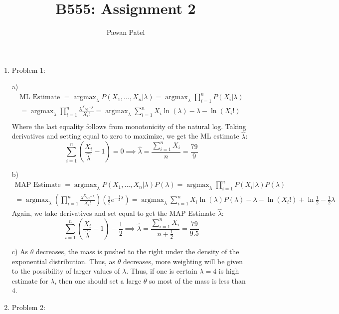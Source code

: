 \documentclass[12pt]{article}
\theoremstyle{plain}
\theoremstyle{definition}
\DeclareMathOperator{\argmax}{argmax}
\begin{document}
 

\title{B555: Assignment 2}
\author{Pawan Patel}
\maketitle

\begin{enumerate}

\item
Problem 1: 

a) 
\begin{align*}
\text{ML Estimate } = \argmax_{\lambda} P(X_1, ..., X_n | \lambda) = \argmax_{\lambda} \prod_{i=1}^n P(X_i|\lambda) \\
= \argmax_{\lambda} \prod_{i=1}^n\frac{\lambda^{X_i}e^{-\lambda}}{X_i !} = \argmax_{\lambda} \sum_{i=1}^n X_i \ln(\lambda) - \lambda - \ln(X_i !) \\
\end{align*}
Where the last equality follows from monotonicity of the natural log. Taking derivatives and setting equal to zero to maximize, we get the ML estimate $\hat \lambda$:
$$ \sum_{i=1}^n (\frac{X_i}{\hat \lambda} - 1) = 0 \implies \hat \lambda = \frac{\sum_{i=1}^n X_i}{n} = \frac{79}{9} $$

b)
\begin{align*}
\text{MAP Estimate } = \argmax_{\lambda} P(X_1, ..., X_n | \lambda)P(\lambda) = \argmax_{\lambda} \prod_{i=1}^n P(X_i|\lambda)P(\lambda) \\
= \argmax_{\lambda} (\prod_{i=1}^n \frac{\lambda^{X_i}e^{-\lambda}}{X_i !})(\frac{1}{2} e^{-\frac{1}{2} \lambda}) = \argmax_{\lambda} \sum_{i=1}^n X_i \ln(\lambda) P(\lambda)- \lambda - \ln(X_i !) + \ln{\frac{1}{2}} - \frac{1}{2}\lambda
\end{align*}
Again, we take derivatives and set equal to get the MAP Estimate $\hat \lambda$:
$$ \sum_{i=1}^n (\frac{X_i}{\hat \lambda} - 1) - \frac{1}{2} \implies \hat \lambda = \frac{\sum_{i=1}^n X_i}{n + \frac{1}{2}} = \frac{79}{9.5}$$

c) 
As $\theta$ decreases, the mass is pushed to the right under the density of the exponential distribution. Thus, as $\theta$ decreases, more weighting will be given to the possibility of larger values of $\lambda$. Thus, if one is certain $\lambda = 4$ is high estimate for $\lambda$, then one should set a large $\theta$ so most of the mass is less than 4. 



\vspace{5pc}
\item
Problem 2:


\end{enumerate}
\end{document}
